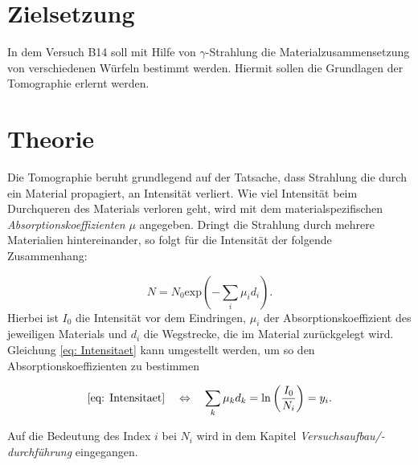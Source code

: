 \setcounter{page}{1}
\section*{Zielsetzung}

In dem Versuch B14 soll mit Hilfe von $\gamma$-Strahlung die
Materialzusammensetzung von verschiedenen Würfeln bestimmt werden.
Hiermit sollen die Grundlagen der Tomographie erlernt werden.

\section{Theorie}

Die Tomographie beruht grundlegend auf der Tatsache, dass Strahlung die %
durch ein Material propagiert, an Intensität verliert. %
Wie viel Intensität beim Durchqueren des Materials verloren geht, wird
mit dem materialspezifischen \emph{Absorptionskoeffizienten} $\mu$ angegeben.
Dringt die Strahlung durch mehrere Materialien hintereinander, so
folgt für die Intensität der folgende Zusammenhang:

\begin{equation}
  \label{eq: Intensitaet}
  N=N_0 \mathrm{exp}\left( - \sum_i \mu_i d_i \right).
\end{equation}
Hierbei ist $I_0$ die Intensität vor dem Eindringen, $\mu_i$ der
Absorptionskoeffizient des jeweiligen Materials und $d_i$ die
Wegstrecke, die im Material zurückgelegt wird.
Gleichung \eqref{eq: Intensitaet} kann umgestellt werden, um so den Absorptionskoeffizienten zu bestimmen

\begin{equation}
  \label{eq: I_umge}
  \eqref{eq: Intensitaet} \quad \Leftrightarrow \quad  \sum_k \mu_k d_k = \ln\left( \frac{ I_0}{N_i} \right)=y_i.
\end{equation}

Auf die Bedeutung des Index $i$ bei $N_i$ wird in dem Kapitel \emph{Versuchsaufbau/-durchführung} eingegangen. %
